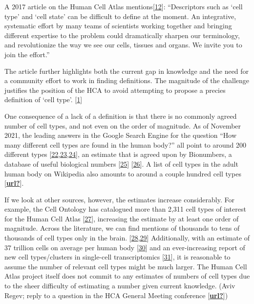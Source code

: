 A 2017 article on the Human Cell Atlas mentions{[}\protect\hyperlink{ref-BlxFp1v3}{12}{]}:
``Descriptors such as `cell type' and `cell state' can be difficult to define at the moment. An integrative, systematic effort by many teams of scientists working together and bringing different expertise to the problem could dramatically sharpen our terminology, and revolutionize the way we see our cells, tissues and organs. We invite you to join the effort.''

The article further highlights both the current gap in knowledge and the need for a community effort to work in finding definitions.
The magnitude of the challenge justifies the position of the HCA to avoid attempting to propose a precies definition of `cell type'. {[}\protect\hyperlink{ref-1GmbExweg}{1}{]}

One consequence of a lack of a definition is that there is no commonly agreed number of cell types, and not even on the order of magnitude.
As of November 2021, the leading answers in the Google Search Engine for the question ``How many different cell types are found in the human body?'' all point to around 200 different types {[}\protect\hyperlink{ref-V85zvNGa}{22},\protect\hyperlink{ref-SKmDXJlO}{23},\protect\hyperlink{ref-WBDY0Uoy}{24}{]}, an estimate that is agreed upon by Bionumbers, a database of useful biological numbers {[}\protect\hyperlink{ref-SprCx2w6}{25}{]} {[}\protect\hyperlink{ref-jePJgR0H}{26}{]}.
A list of cell types in the adult human body on Wikipedia also amounts to around a couple hundred cell types {[}\protect\hyperlink{ref-url}{\textbf{url?}}{]}.

If we look at other sources, however, the estimates increase considerably.
For example, the Cell Ontology has catalogued more than 2,311 cell types of interest for the Human Cell Atlas {[}\protect\hyperlink{ref-J5X2Xu6M}{27}{]}, increasing the estimate by at least one order of magnitude.
Across the literature, we can find mentions of thousands to tens of thousands of cell types only in the brain. {[}\protect\hyperlink{ref-15efKvxi0}{28},\protect\hyperlink{ref-wvN4dtjQ}{29}{]}
Additionally, with an estimate of 37 trillion cells on average per human body {[}\protect\hyperlink{ref-xWhvkd3B}{30}{]} and an ever-increasing report of new cell types/clusters in single-cell transcriptomics {[}\protect\hyperlink{ref-HFiosSKK}{31}{]}, it is reasonable to assume the number of relevant cell types might be much larger.
The Human Cell Atlas project itself does not commit to any estimates of numbers of cell types due to the sheer difficulty of estimating a number given current knowledge. (Aviv Regev; reply to a question in the HCA General Meeting conference {[}\protect\hyperlink{ref-url}{\textbf{url?}}{]})

